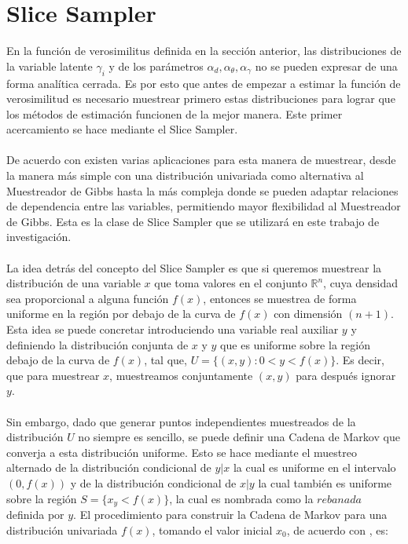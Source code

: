 \chapter{Slice Sampler}
En la funci\'on de verosimilitus definida en la secci\'on anterior, las distribuciones de la variable latente $\gamma_i$ y de los par\'ametros $\alpha_d,\alpha_\theta,\alpha_\gamma$ no se pueden expresar de una forma anal\'itica cerrada. Es por esto que antes de empezar a estimar la funci\'on de verosimilitud es necesario muestrear primero estas distribuciones para lograr que los m\'etodos de estimaci\'on funcionen de la mejor manera. Este primer acercamiento se hace mediante el Slice Sampler.\\
\\
De acuerdo con \cite{neal2003slice} existen varias aplicaciones para esta manera de muestrear, desde la manera m\'as simple con una distribuci\'on univariada como alternativa al Muestreador de Gibbs hasta la m\'as compleja donde se pueden adaptar relaciones de dependencia entre las variables, permitiendo mayor flexibilidad al Muestreador de Gibbs. Esta es la clase de Slice Sampler que se utilizar\'a en este trabajo de investigaci\'on.\\
\\
La idea detr\'as del concepto del Slice Sampler es que si queremos muestrear la distribuci\'on de una variable $x$ que toma valores en el conjunto $\mathbb{R}^n$, cuya densidad sea proporcional a alguna funci\'on $f(x)$, entonces se muestrea de forma uniforme en la regi\'on por debajo de la curva de $f(x)$ con dimensi\'on $(n+1)$. Esta idea se puede concretar introduciendo una variable real auxiliar $y$ y definiendo la distribuci\'on conjunta de $x$ y $y$ que es uniforme sobre la regi\'on debajo de la curva de $f(x)$, tal que, $U=\{(x,y):0<y<f(x)\}$. Es decir, que para muestrear $x$, muestreamos conjuntamente $(x,y)$ para despu\'es ignorar $y$.\\
\\
Sin embargo, dado que generar puntos independientes muestreados de la distribuci\'on $U$ no siempre es sencillo, se puede definir una Cadena de Markov que converja a esta distribuci\'on uniforme. Esto se hace mediante el muestreo alternado de la distribuci\'on condicional de $y|x$ la cual es uniforme en el intervalo $(0,f(x))$ y de la distribuci\'on condicional de $x|y$ la cual tambi\'en es uniforme sobre la regi\'on $S=\{x_y<f(x)\}$, la cual es nombrada como la $rebanada$ definida por $y$. El procedimiento para construir la Cadena de Markov para una distribuci\'on univariada $f(x)$, tomando el valor inicial $x_0$, de acuerdo con \cite{neal2003slice}, es:
